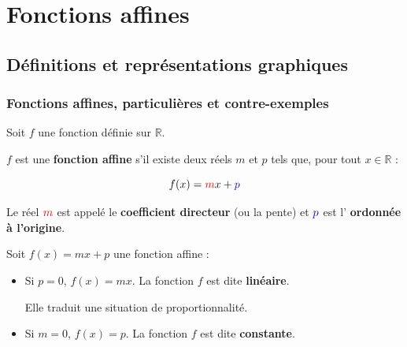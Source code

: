 \chapter{Fonctions affines}

\section{Définitions et représentations graphiques}

\subsection{Fonctions affines, particulières et contre-exemples}

\begin{defin}
	Soit $f$ une fonction définie sur $\mathbb{R}$.

	$f$ est une \textbf{fonction affine} s'il existe deux réels $m$ et $p$ tels que, pour tout $x \in \mathbb{R}$ :

	\[
		f(x) = \textcolor{red}{m}x + \textcolor{blue}{p}
	\]

	Le réel $\textcolor{red}{m}$ est appelé le \textbf{coefficient directeur} (ou la pente) et $\textcolor{blue}{p}$ est l' \textbf{ordonnée à l'origine}.
\end{defin}

\begin{defin}
	Soit $f(x) = mx + p$ une fonction affine :

	\begin{itemize}
		\item Si $p = 0$, $f(x) = mx$. La fonction $f$ est dite \textbf{linéaire}.

		      Elle traduit une situation de proportionnalité.
		\item Si $m = 0$, $f(x) = p$. La fonction $f$ est dite \textbf{constante}.
	\end{itemize}
\end{defin}

